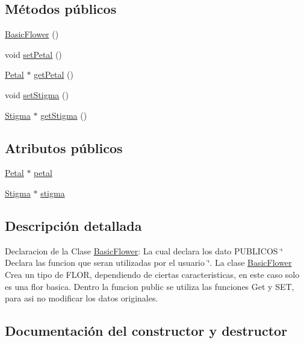 \subsection*{Métodos públicos}
\begin{DoxyCompactItemize}
\item 
\mbox{\hyperlink{class_basic_flower_a8e24219d32c5156a7c31a5e97c376456}{Basic\+Flower}} ()
\item 
void \mbox{\hyperlink{class_basic_flower_ac3e16a24c7d5455788751427cfb87850}{set\+Petal}} ()
\item 
\mbox{\hyperlink{class_petal}{Petal}} $\ast$ \mbox{\hyperlink{class_basic_flower_a580611b6b079b875875f06dae0657c38}{get\+Petal}} ()
\item 
void \mbox{\hyperlink{class_basic_flower_a5d3135f1753631e9d2a01de6d40184e8}{set\+Stigma}} ()
\item 
\mbox{\hyperlink{class_stigma}{Stigma}} $\ast$ \mbox{\hyperlink{class_basic_flower_a30bafa765344b162b3a49c80a70c78ee}{get\+Stigma}} ()
\end{DoxyCompactItemize}
\subsection*{Atributos públicos}
\begin{DoxyCompactItemize}
\item 
\mbox{\hyperlink{class_petal}{Petal}} $\ast$ \mbox{\hyperlink{class_basic_flower_a7adedb18ffb4d77cf988168828c1065f}{petal}}
\item 
\mbox{\hyperlink{class_stigma}{Stigma}} $\ast$ \mbox{\hyperlink{class_basic_flower_af7f27a818b9fd75289663c828bb1aa9e}{stigma}}
\end{DoxyCompactItemize}


\subsection{Descripción detallada}
Declaracion de la Clase \mbox{\hyperlink{class_basic_flower}{Basic\+Flower}}\+: La cual declara los dato P\+U\+B\+L\+I\+C\+OS \char`\"{} Declara las funcion que seran utilizadas por el usuario \char`\"{}. La clase \mbox{\hyperlink{class_basic_flower}{Basic\+Flower}} Crea un tipo de F\+L\+OR, dependiendo de ciertas caracteristicas, en este caso solo es una flor basica. Dentro la funcion public se utiliza las funciones Get y S\+ET, para asi no modificar los datos originales. 

\subsection{Documentación del constructor y destructor}
\mbox{\label{class_basic_flower_a8e24219d32c5156a7c31a5e97c376456}} 
